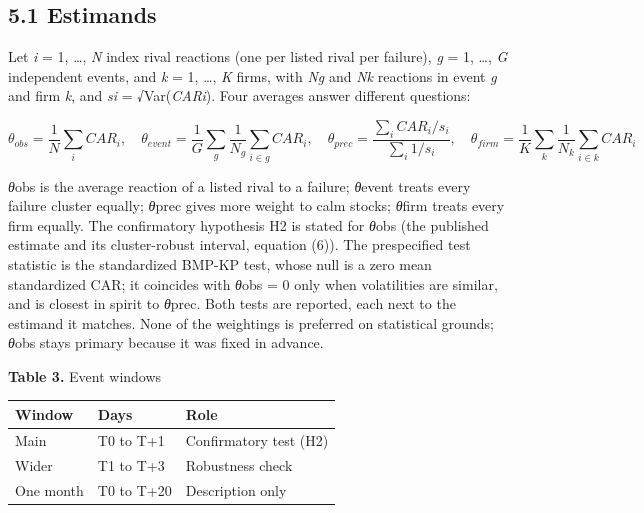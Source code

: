\documentclass[12pt,a4paper]{article}
\begin{document}
\subsection*{5.1 Estimands}
Let \emph{i} = 1, …, \emph{N} index rival reactions (one per listed rival per failure), \emph{g} = 1, …, \emph{G} independent events, and \emph{k} = 1, …, \emph{K} firms, with \emph{N}\emph{g} and \emph{N}\emph{k} reactions in event \emph{g} and firm \emph{k}, and \emph{s}\emph{i} = √Var(\emph{CAR}\emph{i}). Four averages answer different questions:

\begin{equation}
\theta_{obs} = \frac{1}{N}\sum_i CAR_i,\quad \theta_{event} = \frac{1}{G}\sum_g \frac{1}{N_g}\sum_{i\in g} CAR_i,\quad \theta_{prec} = \frac{\sum_i CAR_i/s_i}{\sum_i 1/s_i},\quad \theta_{firm} = \frac{1}{K}\sum_k \frac{1}{N_k}\sum_{i\in k} CAR_i
\end{equation}

\emph{θ}obs is the average reaction of a listed rival to a failure; \emph{θ}event treats every failure cluster equally; \emph{θ}prec gives more weight to calm stocks; \emph{θ}firm treats every firm equally. The confirmatory hypothesis H2 is stated for \emph{θ}obs (the published estimate and its cluster-robust interval, equation (6)). The prespecified test statistic is the standardized BMP-KP test, whose null is a zero mean standardized CAR; it coincides with \emph{θ}obs = 0 only when volatilities are similar, and is closest in spirit to \emph{θ}prec. Both tests are reported, each next to the estimand it matches. None of the weightings is preferred on statistical grounds; \emph{θ}obs stays primary because it was fixed in advance.

\par\noindent\begin{minipage}{\textwidth}
\textbf{Table 3.} Event windows

{\small\setlength{\tabcolsep}{4pt}\begin{tabularx}{\textwidth}{llX}
\toprule
\textbf{Window} & \textbf{Days} & \textbf{Role} \\
\midrule
Main & T0 to T+1 & Confirmatory test (H2) \\
Wider & T\textminus{}1 to T+3 & Robustness check \\
One month & T0 to T+20 & Description only \\
\bottomrule
\end{tabularx}}
\vspace{6pt}

\end{minipage}\par\vspace{4pt}
\end{document}

